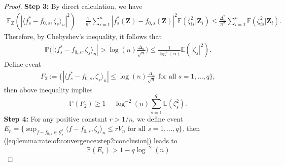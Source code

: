 \documentclass[11pt, preprint]{imsart}
\numberwithin{equation}{section}
\def \mcG{\mathcal{G}}
\def \bfZ{\mathbf{Z}}
\def \ev{\mathbb{E}}
\def \pr{\mathbb{P}}
\theoremstyle{plain}
\theoremstyle{definition}
\begin{document}
\begin{proof}
\noindent \textbf{Step 3:}
By direct calculation, we have
\begin{eqnarray}
	\ev_{\mathbb{Z}}(|\langle f_s^*-f_{0,s}, \zeta_s  \rangle_n|^2)= \frac{1}{n^2}\sum_{i=1}^n|f_s^*(\bfZ)-f_{0,s}(\bfZ)|^2\ev(\zeta_{is}^2|\bfZ_i)\leq \frac{\Delta_n^2}{n^2}\sum_{i=1}^n\ev(\zeta_{is}^2|\bfZ_i).\nonumber
\end{eqnarray}
Therefore, by Chebyshev's inequality, it follows that 
\begin{eqnarray}
	\pr\bigg(|\langle f_s^*-f_{0,s}, \zeta_s  \rangle_n|>\log(n)\frac{\Delta_n}{\sqrt{n}}\bigg)\leq  \frac{1}{\log^2(n)}\ev(|\zeta_s|^2).\nonumber
\end{eqnarray}
Define event 
\begin{eqnarray*}
F_2:=\bigg\{|\langle f_s^*-f_{0,s}, \zeta_s  \rangle_n|\leq\log(n)\frac{\Delta_n}{\sqrt{n}}\textrm{ for all } s=1,\ldots, q\bigg\},
\end{eqnarray*}
then above inequality implies 
\begin{equation}\label{eq:lemma:rate:of:convergence:step3:conclusion}
	\pr(F_2)\geq 1-\log^{-2}(n)\sum_{s=1}^q\ev(\zeta_s^2).
\end{equation}
\newline
\noindent \textbf{Step 4:}
For any positive constant $r>1/n$, we define event $E_r=\{\sup_{f-f_{0, s}\in \mcG_s^r}\langle f-f_{0, s}, \zeta_s\rangle_n\leq rV_n \textrm{ for all } s=1,\ldots, q\}$, then (\ref{eq:lemma:rate:of:convergence:step2:conclusion}) leads to
\begin{equation}\label{eq:lemma:rate:of:convergence:Er}
	 \pr(E_r)>1-q\log^{-2}(n)
\end{equation}


\end{proof}
\end{document}
